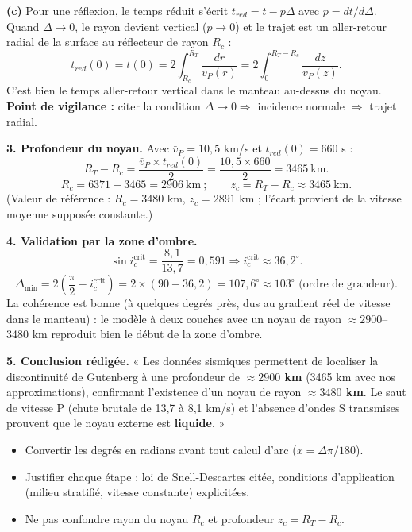 \documentclass[11pt]{article}
\begin{document}
\begin{corrige}
\textbf{(c)} Pour une réflexion, le temps réduit s'écrit $t_{red} = t - p\Delta$ avec $p = dt/d\Delta$. Quand $\Delta \to 0$, le rayon devient vertical ($p \to 0$) et le trajet est un aller-retour radial de la surface au réflecteur de rayon $R_c$ :
\[ t_{red}(0) = t(0) = 2 \int_{R_c}^{R_T} \frac{dr}{v_P(r)} = 2 \int_0^{R_T - R_c} \frac{dz}{v_P(z)}. \]
C'est bien le temps aller-retour vertical dans le manteau au-dessus du noyau. \textbf{Point de vigilance :} citer la condition $\Delta \to 0 \Rightarrow$ incidence normale $\Rightarrow$ trajet radial.

\textbf{3. Profondeur du noyau.} Avec $\bar v_P = 10{,}5$ km/s et $t_{red}(0) = 660$ s :
\[ R_T - R_c = \frac{\bar v_P \times t_{red}(0)}{2} = \frac{10{,}5 \times 660}{2} = 3465 \ \text{km}. \]
\[ R_c = 6371 - 3465 = 2906 \ \text{km} \ ; \qquad z_c = R_T - R_c \approx 3465 \ \text{km}. \]
(Valeur de référence : $R_c = 3480$ km, $z_c = 2891$ km ; l'écart provient de la vitesse moyenne supposée constante.)

\textbf{4. Validation par la zone d'ombre.}
\[ \sin i_c^{\text{crit}} = \frac{8{,}1}{13{,}7} = 0{,}591 \Rightarrow i_c^{\text{crit}} \approx 36{,}2^\circ. \]
\[ \Delta_{\min} = 2\left(\frac{\pi}{2} - i_c^{\text{crit}}\right) = 2 \times (90 - 36{,}2) = 107{,}6^\circ \approx 103^\circ \text{ (ordre de grandeur).} \]
La cohérence est bonne (à quelques degrés près, dus au gradient réel de vitesse dans le manteau) : le modèle à deux couches avec un noyau de rayon $\approx 2900$--3480 km reproduit bien le début de la zone d'ombre.

\textbf{5. Conclusion rédigée.} « Les données sismiques permettent de localiser la discontinuité de Gutenberg à une profondeur de \textbf{$\approx 2900$ km} (3465 km avec nos approximations), confirmant l'existence d'un noyau de rayon \textbf{$\approx 3480$ km}. Le saut de vitesse P (chute brutale de 13,7 à 8,1 km/s) et l'absence d'ondes S transmises prouvent que le noyau externe est \textbf{liquide}. »
\end{corrige}

\begin{attention}
\begin{itemize}
    \item Convertir les degrés en radians avant tout calcul d'arc ($x = \Delta \pi/180$).
    \item Justifier chaque étape : loi de Snell-Descartes citée, conditions d'application (milieu stratifié, vitesse constante) explicitées.
    \item Ne pas confondre rayon du noyau $R_c$ et profondeur $z_c = R_T - R_c$.
\end{itemize}
\end{attention}
\end{document}
